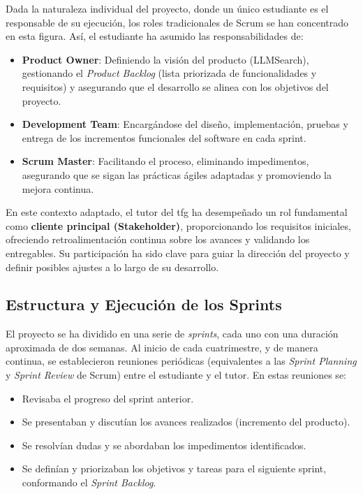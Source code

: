 Dada la naturaleza individual del proyecto, donde un único estudiante es el responsable de su ejecución, los roles tradicionales de Scrum se han concentrado en esta figura. Así, el estudiante ha asumido las responsabilidades de:
\begin{itemize}
    \item \textbf{Product Owner}: Definiendo la visión del producto (LLMSearch), gestionando el \textit{Product Backlog} (lista priorizada de funcionalidades y requisitos) y asegurando que el desarrollo se alinea con los objetivos del proyecto.
    \item \textbf{Development Team}: Encargándose del diseño, implementación, pruebas y entrega de los incrementos funcionales del software en cada sprint.
    \item \textbf{Scrum Master}: Facilitando el proceso, eliminando impedimentos, asegurando que se sigan las prácticas ágiles adaptadas y promoviendo la mejora continua.
\end{itemize}
En este contexto adaptado, el tutor del \gls{tfg} ha desempeñado un rol fundamental como \textbf{cliente principal (Stakeholder)}, proporcionando los requisitos iniciales, ofreciendo retroalimentación continua sobre los avances y validando los entregables. Su participación ha sido clave para guiar la dirección del proyecto y definir posibles ajustes a lo largo de su desarrollo.

\subsection{Estructura y Ejecución de los Sprints}
\label{subsec:sprints}

El proyecto se ha dividido en una serie de \textit{sprints}, cada uno con una duración aproximada de dos semanas. Al inicio de cada cuatrimestre, y de manera continua, se establecieron reuniones periódicas (equivalentes a las \textit{Sprint Planning} y \textit{Sprint Review} de Scrum) entre el estudiante y el tutor. En estas reuniones se:
\begin{itemize}
    \item Revisaba el progreso del sprint anterior.
    \item Se presentaban y discutían los avances realizados (incremento del producto).
    \item Se resolvían dudas y se abordaban los impedimentos identificados.
    \item Se definían y priorizaban los objetivos y tareas para el siguiente sprint, conformando el \textit{Sprint Backlog}.
\end{itemize}

